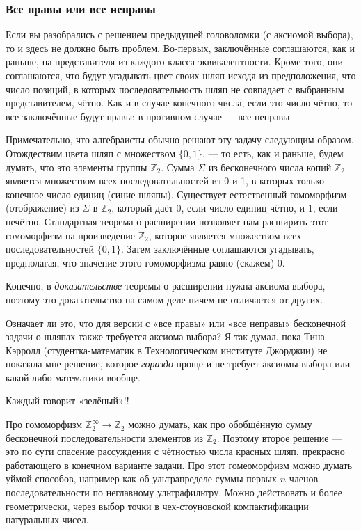 \subsubsection*{Все правы или все неправы}

Если вы разобрались с решением предыдущей головоломки (с аксиомой выбора), то и здесь не должно быть проблем.
Во-первых, заключённые соглашаются, как и раньше, на представителя из каждого класса эквивалентности.
Кроме того, они соглашаются, что будут угадывать цвет своих шляп исходя из предположения, что число позиций, в которых последовательность шляп не совпадает с выбранным представителем, чётно.
Как и в случае конечного числа, если это число чётно, то все заключённые будут правы; в противном случае --- все неправы.

Примечательно, что алгебраисты обычно решают эту задачу следующим образом.
Отождествим цвета шляп с множеством $\{0, 1\}$, --- то есть, как и раньше, 
будем думать, что это элементы группы $\mathbb{Z}_2$.
Сумма $\Sigma$ из бесконечного числа копий $\mathbb{Z}_2$ является множеством всех последовательностей из 0 и 1, в которых только конечное число единиц (синие шляпы).
Существует естественный гомоморфизм (отображение) из $\Sigma$ в $\mathbb{Z}_2$, который даёт 0, если число единиц чётно, и 1, если нечётно.
Стандартная теорема о расширении позволяет нам расширить этот гомоморфизм на произведение $\mathbb{Z}_2$, которое является множеством всех последовательностей $\{0, 1\}$.
Затем заключённые соглашаются угадывать, предполагая, что значение этого гомоморфизма равно (скажем) 0.

Конечно, в \emph{доказательстве} теоремы о расширении нужна аксиома выбора, поэтому это доказательство на самом деле ничем не отличается от других.

Означает ли это, что для версии с «все правы» или «все неправы» бесконечной задачи о шляпах также требуется аксиома выбора?
Я так думал, пока Тина Кэрролл (студентка-математик в Технологическом институте Джорджии) не показала мне решение, которое \emph{гораздо} проще и не требует аксиомы выбора или какой-либо математики вообще.

Каждый говорит «зелёный»!!

\begin{addedbytheeditors}
Про гомоморфизм $\mathbb{Z}_2^\infty\to \mathbb{Z}_2$ можно думать, как про обобщённую сумму бесконечной последовательности элементов из $\mathbb{Z}_2$.
Поэтому второе решение --- это по сути спасение рассуждения с чётностью числа красных шляп, прекрасно работающего в конечном варианте задачи.
Про этот гомеоморфизм можно думать уймой способов, например как об ультрапределе суммы первых $n$ членов последовательности по неглавному ультрафильтру.
Можно действовать и более геометрически, через выбор точки в чех-стоуновской компактификации натуральных чисел.\pr
\end{addedbytheeditors}


